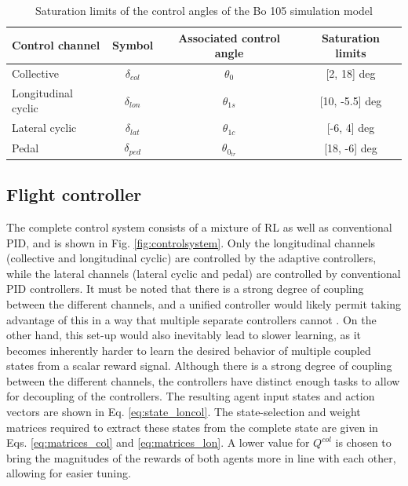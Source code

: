 \begin{table}[ht]
    \centering
    \caption{Saturation limits of the control angles of the Bo 105 simulation model \cite{BO105DataSheet}}
    \label{tab:heli_control_ranges}
    \begin{tabular}{@{}lccc@{}}
    \toprule
    Control channel     & Symbol         & Associated control angle  & Saturation limits  \\ \midrule
    Collective          & $\delta_{col}$ & $\theta_0$        & [2, 18] deg   \\
    Longitudinal cyclic & $\delta_{lon}$ & $\theta_{1s}$     & [10, -5.5] deg \\
    Lateral cyclic      & $\delta_{lat}$ & $\theta_{1c}$     & [-6, 4] deg   \\
    Pedal               & $\delta_{ped}$ & $\theta_{0_{tr}}$ & [18, -6] deg  \\ \bottomrule
    \end{tabular}
\end{table}

\subsection{Flight controller} \label{ssec:controllerdesign}
The complete control system consists of a mixture of RL as well as conventional PID, and is shown in Fig. \ref{fig:controlsystem}. Only the longitudinal channels (collective and longitudinal cyclic) are controlled by the adaptive controllers, while the lateral channels (lateral cyclic and pedal) are controlled by conventional PID controllers. It must be noted that there is a strong degree of coupling between the different channels, and a unified controller would likely permit taking advantage of this in a way that multiple separate controllers cannot \cite{Enns2003a}. On the other hand, this set-up would also inevitably lead to slower learning, as it becomes inherently harder to learn the desired behavior of multiple coupled states from a scalar reward signal. Although there is a strong degree of coupling between the different channels, the controllers have distinct enough tasks to allow for decoupling of the controllers. The resulting agent input states and action vectors are shown in Eq. \eqref{eq:state_loncol}. The state-selection and weight matrices required to extract these states from the complete state are given in Eqs. \eqref{eq:matrices_col} and \eqref{eq:matrices_lon}. A lower value for $Q^{col}$ is chosen to bring the magnitudes of the rewards of both agents more in line with each other, allowing for easier tuning.

